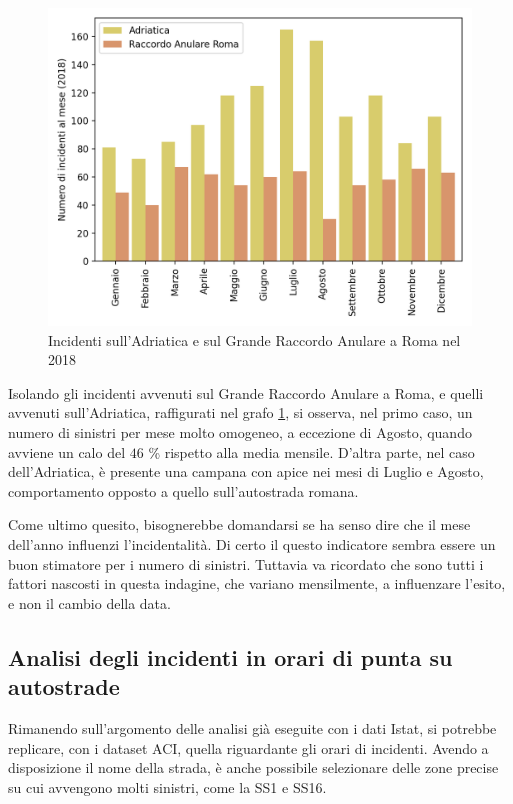 \documentclass[a4paper,12pt]{report}
\begin{document}
\begin{figure}
    \hfill\includegraphics[width=0.7\linewidth]{../src/incidenti/incidenti_aci/autostrade/adriatica_roma.png}\hspace*{\fill}
    \caption{Incidenti sull'Adriatica e sul Grande Raccordo Anulare a Roma nel 2018}
    \label{fig:adriatica-roma}
\end{figure}

Isolando gli incidenti avvenuti sul Grande Raccordo Anulare a Roma, e quelli avvenuti 
sull'Adriatica, raffigurati nel grafo \ref{fig:adriatica-roma}, si osserva, 
nel primo caso, un numero di sinistri per mese molto omogeneo, a eccezione di 
Agosto, quando avviene un calo del $46$ \% rispetto alla media mensile. 
D'altra parte, nel caso dell'Adriatica, è presente una campana con apice nei 
mesi di Luglio e Agosto, comportamento opposto a quello sull'autostrada 
romana. 

Come ultimo quesito, bisognerebbe domandarsi se ha senso dire che il mese dell'anno 
influenzi l'incidentalità. 
Di certo il questo indicatore sembra essere un buon stimatore 
per i numero di sinistri. 
Tuttavia va ricordato che sono tutti i fattori 
nascosti in questa indagine, che variano mensilmente, a influenzare l'esito, e 
non il cambio della data. 

\subsection{Analisi degli incidenti in orari di punta su autostrade}

Rimanendo sull'argomento delle analisi già eseguite con i dati Istat, 
si potrebbe replicare, con i dataset ACI, quella riguardante gli orari di incidenti. 
Avendo a disposizione il nome della strada, è anche possibile selezionare delle zone precise 
su cui avvengono molti sinistri, come la SS1 e SS16. 
\end{document}
